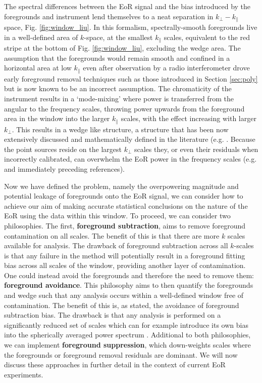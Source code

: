 The spectral differences between the EoR signal and the bias introduced by the foregrounds and instrument lend themselves to a neat separation in $k_\bot-k_\parallel$ space, Fig. \ref{fig:window_liu}. In this formalism, spectrally-smooth foregrounds live in a well-defined area of $k$-space, at the smallest $k_\parallel$ scales, equivalent to the red stripe at the bottom of Fig. \ref{fig:window_liu}, excluding the wedge area. The assumption that the foregrounds would remain smooth and confined in a horizontal area at low $k_\parallel$ even after observation by a radio interferometer drove early foreground removal techniques such as those introduced in Section \ref{sec:poly} but is now known to be an incorrect assumption. The chromaticity of the instrument results in a `mode-mixing' where power is transferred from the angular to the frequency scales, throwing power upwards from the foreground area in the window into the larger $k_\parallel$ scales, with the effect increasing with larger $k_\bot$. This results in a wedge like structure, a structure that has been now extensively discussed and mathematically defined in the literature (e.g. \cite{Jensen2016MNRAS.456...66J,Dillon2014PhRvD..89b3002D,Liu2014PhRvD..90b3019L,Liu2014PhRvD..90b3018L,Hazelton2013ApJ...770..156H,Thyagarajan2013ApJ...776....6T,Pober2013ApJ...768L..36P,Morales2012ApJ...752..137M,Vedantham2012ApJ...745..176V,Trott2012ApJ...757..101T,Parsons2012ApJ...756..165P,Datta2010ApJ...724..526D}. Because the point sources reside on the largest $k_\bot$ scales they, or even their residuals when incorrectly calibrated, can overwhelm the EoR power in the frequency scales (e.g. \cite{Bowman2009ApJ...695..183B} and immediately preceding references).

Now we have defined the problem, namely the overpowering magnitude and potential leakage of foregrounds onto the EoR signal, we can consider how to achieve our aim of making accurate statistical conclusions on the nature of the EoR using the data within this window. To proceed, we can consider two philosophies. The first, \textbf{foreground subtraction}, aims to remove foreground contamination on all scales. The benefit of this is that there are more $k$ scales available for analysis. The drawback of foreground subtraction across all $k$-scales is that any failure in the method will potentially result in a foreground fitting bias across all scales of the window, providing another layer of contamination. One could instead avoid the foregrounds and therefore the need to remove them: \textbf{foreground avoidance}. This philosophy aims to then quantify the foregrounds and wedge such that any analysis occurs within a well-defined window free of contamination. The benefit of this is, as stated, the avoidance of foreground subtraction bias. The drawback is that any analysis is performed on a significantly reduced set of scales which can for example introduce its own bias into the spherically averaged power spectrum \cite{Jensen2016MNRAS.456...66J}. Additional to both philosophies, we can implement \textbf{foreground suppression}, which down-weights scales where the foregrounds or foreground removal residuals are dominant. We will now discuss these approaches in further detail in the context of current EoR experiments.

